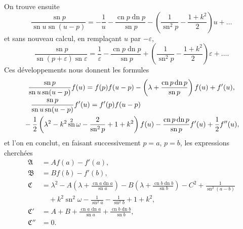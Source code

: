 \documentclass[11pt,leqno,oneside,letterpaper]{book}[2005/09/16]
\DeclareMathOperator{\sn}{sn}
\DeclareMathOperator{\cn}{cn}
\DeclareMathOperator{\dn}{dn}
\begin{document}
On trouve ensuite
\[
\frac{ \sn p }{ \sn u \sn (u-p) } =
  -\frac{1}{u} - \frac{ \cn p \dn p }{ \sn p }
  -\left( \frac{1}{ \sn^2 p } - \frac{1 + k^2}{2} \right) u
  + \ldots
\]
et sans nouveau calcul, en rempla\c{c}ant $u$ par $-\varepsilon$,
\[
\frac{ \sn p }{ \sn ( p + \varepsilon ) \sn \varepsilon } =
  \frac{1}{\varepsilon}
  - \frac{ \cn p \dn p }{ \sn p }
  + \left( \frac{1}{ \sn^2 p } - \frac{1 + k^2}{2} \right) \varepsilon
  + \ldots.
\]
Ces d\'eveloppements nous donnent les formules
\begin{multline*}
\frac{ \sn p }{ \sn u \sn (u-p) } f(u)  = f(p)f(u-p)
  - \left( \lambda + \frac{ \cn p \dn p }{ \sn p } \right) f(u)
  + f'(u), \\
\shoveleft{\frac{ \sn p }{ \sn u \sn (u-p) } f'(u) = f'(p) f(u-p) }\\
  {}- \frac{1}{2} \left( \lambda^2 - k^2\sn^2 \omega - \frac{2}{\sn^2 p} + 1 + k^2 \right) f(u)
  -\frac{ \cn p \dn p }{ \sn p } f'(u) + \frac{1}{2} f''(u),
\end{multline*}
et l'on en conclut, en faisant successivement $p=a$, $p=b$, les expressions
cherch\'ees
\begin{align*}
\mathfrak{A}   &= Af(a) - f'(a), \\
\mathfrak{B}   &= Bf(b) - f'(b), \\
\mathfrak{C}   &= \lambda^2
               - A \left( \lambda + \frac{ \cn a \dn a }{ \sn a } \right)
               - B \left( \lambda + \frac{ \cn b \dn b }{ \sn b } \right)
               - C^2 + \frac{1}{ \sn^2(a-b) } \\
               &\quad + k^2 \sn^2 \omega
                  - \frac{1}{\sn^2 a} - \frac{1}{\sn^2 b} + 1 + k^2, \\
\mathfrak{C'}  &= A + B + \frac{ \cn a \dn a }{ \sn a }
                        + \frac{ \cn b \dn b }{ \sn b }, \\
\mathfrak{C''} &= 0.
\end{align*}
\medskip
\end{document}
